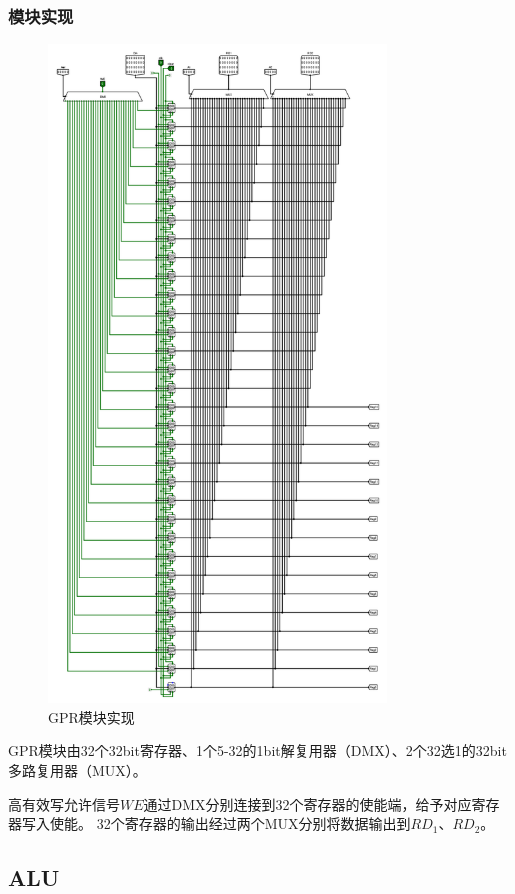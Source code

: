 \documentclass[main.tex]{subfiles}
\begin{document}
\subsubsection{模块实现}
\begin{figure}[h]
\centering
\includegraphics[width=0.8\textwidth]{images/GPR-circuit.png}
\caption{GPR模块实现}
\end{figure}
GPR模块由32个32bit寄存器、1个5-32的1bit解复用器（DMX）、2个32选1的32bit多路复用器（MUX）。

高有效写允许信号$WE$通过DMX分别连接到32个寄存器的使能端，给予对应寄存器写入使能。
32个寄存器的输出经过两个MUX分别将数据输出到$RD_1$、$RD_2$。

\clearpage
\subsection{ALU}
\end{document}
